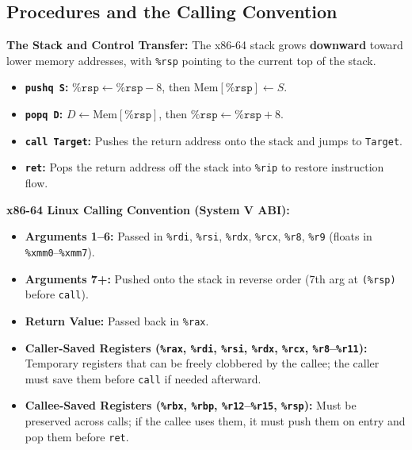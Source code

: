 \subsection{Procedures and the Calling Convention}

\begin{definition}
    \textbf{The Stack and Control Transfer:} The x86-64 stack grows \textbf{downward} toward lower memory addresses, with \texttt{\%rsp} pointing to the current top of the stack.
    \begin{itemize}
        \item \textbf{\texttt{pushq S}:} $\texttt{\%rsp} \leftarrow \texttt{\%rsp} - 8$, then $\text{Mem}[\texttt{\%rsp}] \leftarrow S$.
        \item \textbf{\texttt{popq D}:} $D \leftarrow \text{Mem}[\texttt{\%rsp}]$, then $\texttt{\%rsp} \leftarrow \texttt{\%rsp} + 8$.
        \item \textbf{\texttt{call Target}:} Pushes the return address onto the stack and jumps to \texttt{Target}.
        \item \textbf{\texttt{ret}:} Pops the return address off the stack into \texttt{\%rip} to restore instruction flow.
    \end{itemize}
\end{definition}

\begin{theorem}
    \textbf{x86-64 Linux Calling Convention (System V ABI):}
    \begin{itemize}
        \item \textbf{Arguments 1--6:} Passed in \texttt{\%rdi}, \texttt{\%rsi}, \texttt{\%rdx}, \texttt{\%rcx}, \texttt{\%r8}, \texttt{\%r9} (floats in \texttt{\%xmm0}--\texttt{\%xmm7}).
        \item \textbf{Arguments 7+:} Pushed onto the stack in reverse order (7th arg at \texttt{(\%rsp)} before \texttt{call}).
        \item \textbf{Return Value:} Passed back in \texttt{\%rax}.
        \item \textbf{Caller-Saved Registers (\texttt{\%rax}, \texttt{\%rdi}, \texttt{\%rsi}, \texttt{\%rdx}, \texttt{\%rcx}, \texttt{\%r8}--\texttt{\%r11}):} Temporary registers that can be freely clobbered by the callee; the caller must save them before \texttt{call} if needed afterward.
        \item \textbf{Callee-Saved Registers (\texttt{\%rbx}, \texttt{\%rbp}, \texttt{\%r12}--\texttt{\%r15}, \texttt{\%rsp}):} Must be preserved across calls; if the callee uses them, it must push them on entry and pop them before \texttt{ret}.
    \end{itemize}
\end{theorem}

